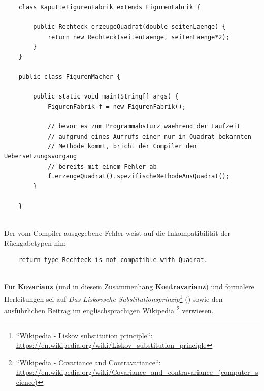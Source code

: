 \begin{verbatim}
    class KaputteFigurenFabrik extends FigurenFabrik {

        public Rechteck erzeugeQuadrat(double seitenLaenge) {
            return new Rechteck(seitenLaenge, seitenLaenge*2);
        }
    }

    public class FigurenMacher {

        public static void main(String[] args) {
            FigurenFabrik f = new FigurenFabrik();

            // bevor es zum Programmabsturz waehrend der Laufzeit
            // aufgrund eines Aufrufs einer nur in Quadrat bekannten
            // Methode kommt, bricht der Compiler den Uebersetzungsvorgang
            // bereits mit einem Fehler ab
            f.erzeugeQuadrat().spezifischeMethodeAusQuadrat();
        }

    }
\end{verbatim}\\

\noindent
Der vom Compiler ausgegebene Fehler weist auf die Inkompatibilität der Rückgabetypen hin:\\

\begin{verbatim}
    return type Rechteck is not compatible with Quadrat.
\end{verbatim}\\

\noindent
Für \textbf{Kovarianz} (und in diesem Zusammenhang \textbf{Kontravarianz}) und formalere Herleitungen sei auf
\textit{Das Liskovsche Substitutionsprinzip}\footnote{``Wikipedia - Liskov substitution principle``: \url{https://en.wikipedia.org/wiki/Liskov_substitution_principle}} (\cite{Lis87})
sowie den ausführlichen Beitrag im englischsprachigen Wikipedia \footnote{
    ``Wikipedia - Covariance and Contravariance``: \url{https://en.wikipedia.org/wiki/Covariance_and_contravariance_(computer_science)}
} verwiesen.
